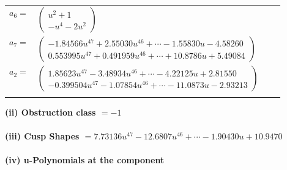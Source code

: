 \documentclass[1p]{elsarticle_modified}
\theoremstyle{definition}
\begin{document}
\begin{tabular}{m{7pt} m{180pt} m{7pt} m{180pt} }
\flushright $a_{6}=$&$\begin{pmatrix}u^2+1\\- u^4-2 u^2\end{pmatrix}$ \\
\flushright $a_{7}=$&$\begin{pmatrix}-1.84566 u^{47}+2.55030 u^{46}+\cdots-1.55830 u-4.58260\\0.553995 u^{47}+0.491959 u^{46}+\cdots+10.8786 u+5.49084\end{pmatrix}$ \\
\flushright $a_{2}=$&$\begin{pmatrix}1.85623 u^{47}-3.48934 u^{46}+\cdots-4.22125 u+2.81550\\-0.399504 u^{47}-1.07854 u^{46}+\cdots-11.0873 u-2.93213\end{pmatrix}$\\&\end{tabular}
\flushleft \textbf{(ii) Obstruction class $= -1$}\\~\\
\flushleft \textbf{(iii) Cusp Shapes $= 7.73136 u^{47}-12.6807 u^{46}+\cdots-1.90430 u+10.9470$}\\~\\
\newpage\renewcommand{\arraystretch}{1}
\flushleft \textbf{(iv) u-Polynomials at the component}\newline \\
\end{document}
